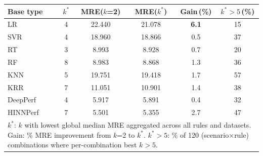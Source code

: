 \begin{tabular}{lccccc}
\toprule
Base type & $k^*$ & MRE($k$=2) & MRE($k^*$) & Gain\,(\%) & $k^*>5$\,(\%) \\
\midrule
LR & 4 & 22.440 & 21.078 & \textbf{6.1} & 15 \\
SVR & 4 & 18.960 & 18.866 & 0.5 & 37 \\
RT & 3 & 8.993 & 8.928 & 0.7 & 20 \\
RF & 8 & 8.983 & 8.868 & 1.3 & 36 \\
KNN & 5 & 19.751 & 19.418 & 1.7 & 57 \\
KRR & 7 & 11.051 & 10.901 & 1.4 & 38 \\
DeepPerf & 4 & 5.917 & 5.891 & 0.4 & 32 \\
HINNPerf & 7 & 5.501 & 5.355 & 2.7 & 47 \\
\bottomrule
\multicolumn{6}{l}{\footnotesize $k^*$: $k$ with lowest global median MRE aggregated across all rules and datasets. Gain: \% MRE improvement from $k$=2 to $k^*$. $k^*>5$: \% of 120 (scenario$\times$rule) combinations where per-combination best $k > 5$.} \\
\end{tabular}
